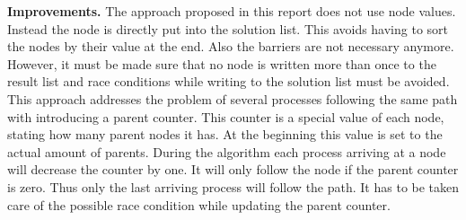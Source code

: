 \documentclass[letterpaper]{article}
\newcommand{\mypar}[1]{{\bf #1.}}
\begin{document}
\mypar{Improvements} 
The approach proposed in this report does not use node values. Instead the node is directly put into the solution list. This avoids having to sort the nodes by their value at the end. Also the barriers are not necessary anymore. However, it must be made sure that no node is written more than once to the result list and race conditions while writing to the solution list must be avoided. This approach addresses the problem of several processes following the same path with introducing a parent counter. This counter is a special value of each node, stating how many parent nodes it has. At the beginning this value is set to the actual amount of parents. During the algorithm each process arriving at a node will decrease the counter by one. It will only follow the node if the parent counter is zero. Thus only the last arriving process will follow the path. It has to be taken care of the possible race condition while updating the parent counter.



 
 
\end{document}
